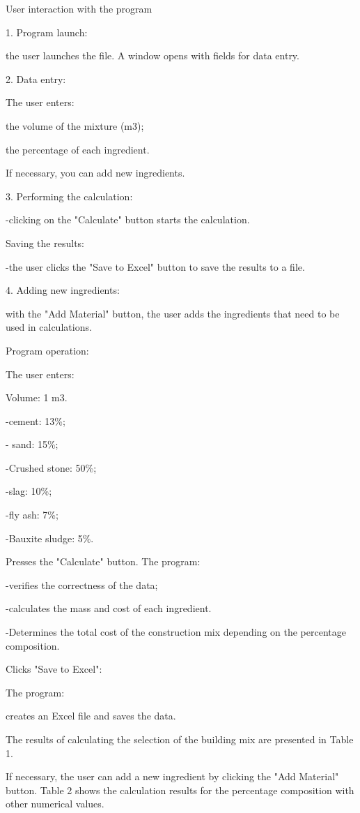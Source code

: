 \begin{multicols}{2}
User interaction with the program

1. Program launch:

the user launches the file. A window opens with fields for data entry.

2. Data entry:

The user enters:

the volume of the mixture (m3);

the percentage of each ingredient.

If necessary, you can add new ingredients.

3. Performing the calculation:

-clicking on the "Calculate" button starts the calculation.

Saving the results:

-the user clicks the "Save to Excel" button to save the results to a
file.

4. Adding new ingredients:

with the "Add Material" button, the user adds the ingredients that need
to be used in calculations.

Program operation:

The user enters:

Volume: 1 m3.

-cement: 13\%;

- sand: 15\%;

-Crushed stone: 50\%;

-slag: 10\%;

-fly ash: 7\%;

-Bauxite sludge: 5\%.

Presses the "Calculate" button. The program:

-verifies the correctness of the data;

-calculates the mass and cost of each ingredient.

-Determines the total cost of the construction mix depending on the
percentage composition.

Clicks "Save to Excel":

The program:

creates an Excel file and saves the data.

The results of calculating the selection of the building mix are
presented in Table 1.
\end{multicols}

If necessary, the user can add a new ingredient by clicking the "Add
Material" button. Table 2 shows the calculation results for the
percentage composition with other numerical values.

